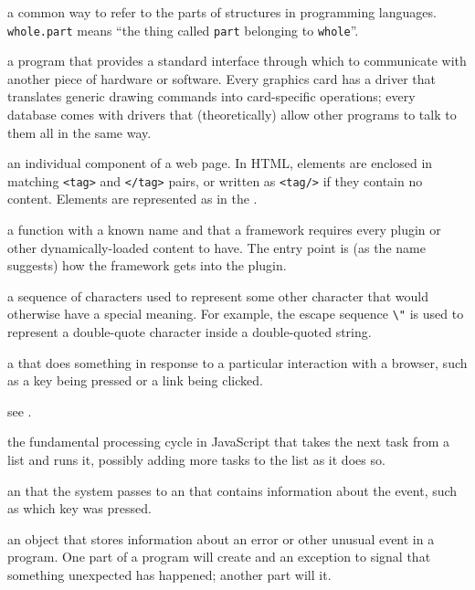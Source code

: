 \begin{description}
a common way to refer to the parts of structures in programming languages.
\texttt{whole.part} means ``the thing called \texttt{part} belonging to \texttt{whole}''.

a program that provides a standard interface through which to communicate with
another piece of hardware or software. Every graphics card has a driver that
translates generic drawing commands into card-specific operations; every
database comes with drivers that (theoretically) allow other programs to talk
to them all in the same way.

an individual component of a web page. In HTML, elements are enclosed in
matching \texttt{{\textless}tag{\textgreater}{}} and \texttt{{\textless}/tag{\textgreater}{}} pairs, or written as \texttt{{\textless}tag/{\textgreater}{}} if they contain no
content. Elements are represented as  in the .

a function with a known name and  that a framework
requires every plugin or other dynamically-loaded content to have. The entry
point is (as the name suggests) how the framework gets into the plugin.

a sequence of characters used to represent some other character that would
otherwise have a special meaning. For example, the escape sequence \texttt{\textbackslash{}"} is
used to represent a double-quote character inside a double-quoted string.

a  that does something in response to
a particular interaction with a browser, such as a key being pressed or a link
being clicked.

see .

the fundamental processing cycle in JavaScript that takes the next task from a
list and runs it, possibly adding more tasks to the list as it does so.

an  that the system passes to an  that contains information about the event, such as
which key was pressed.

an object that stores information about an error or other unusual event in a
program. One part of a program will create and  an exception
to signal that something unexpected has happened; another part will
 it.


\end{description}

